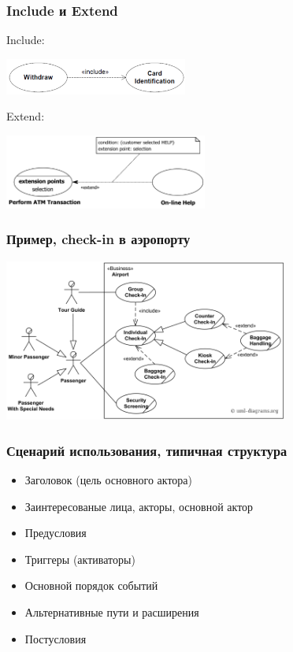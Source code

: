\documentclass{../cscslides}
\begin{document}
    \begin{frame}
        \frametitle{Include и Extend}
        Include:
        \begin{center}
            \includegraphics[width=0.45\textwidth]{useCaseInclude.png}
        \end{center}
        \vspace{5mm}
        Extend:
        \begin{center}
            \includegraphics[width=0.5\textwidth]{useCaseExtend.png}
        \end{center}
    \end{frame}

    \begin{frame}
        \frametitle{Пример, check-in в аэропорту}
        \begin{center}
            \includegraphics[width=0.7\textwidth]{airportUseCase.png}
        \end{center}
    \end{frame}

    \begin{frame}
        \frametitle{Сценарий использования, типичная структура}
        \begin{itemize}
            \item Заголовок (цель основного актора)
            \item Заинтересованые лица, акторы, основной актор
            \item Предусловия
            \item Триггеры (активаторы)
            \item Основной порядок событий
            \item Альтернативные пути и расширения
            \item Постусловия
        \end{itemize}
    \end{frame}
\end{document}
